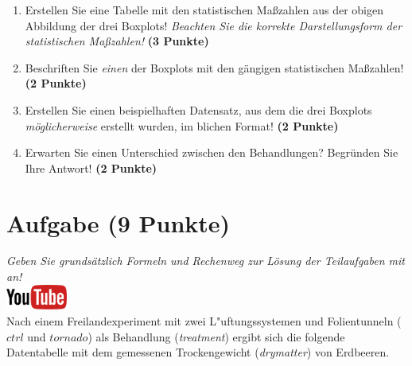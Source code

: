 \documentclass[a4paper, 9pt]{scrartcl}\usepackage[]{graphicx}\usepackage[]{xcolor}
\begin{document}
\begin{enumerate}
\item Erstellen Sie eine Tabelle mit den statistischen Ma{\ss}zahlen aus der
  obigen Abbildung der drei Boxplots! \textit{Beachten Sie die korrekte
    Darstellungsform der statistischen Ma{\ss}zahlen!} \textbf{(3 Punkte)}
\item Beschriften Sie \textit{einen} der Boxplots mit den g{\"a}ngigen
  statistischen Ma{\ss}zahlen! \textbf{(2 Punkte)}
\item Erstellen Sie einen beispielhaften Datensatz, aus dem die drei
  Boxplots \textit{m{\"o}glicherweise} erstellt wurden, im blichen Format! \textbf{(2 Punkte)}
\item Erwarten Sie einen Unterschied zwischen den Behandlungen? Begr{\"u}nden
  Sie Ihre Antwort! \textbf{(2 Punkte)}
\end{enumerate} 
\clearpage

\section{Aufgabe \hfill (9 Punkte)}

\textit{Geben Sie grunds{\"a}tzlich Formeln und Rechenweg zur L{\"o}sung der
  Teilaufgaben mit an!} \\[1Ex]

\hfill\href{https://youtu.be/0xc0jIPeiyw}{\includegraphics[width =
  2cm]{img/youtube}}\\[1Ex]



Nach einem Freilandexperiment mit zwei L{"u}ftungssystemen und Folientunneln ($ctrl$ und $tornado$) als Behandlung
(\textit{treatment}) ergibt sich die folgende Datentabelle mit dem
gemessenen Trockengewicht (\textit{drymatter}) von Erdbeeren.
\end{document}
